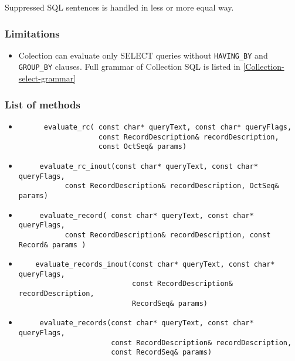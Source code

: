  Suppressed SQL sentences is handled in less or more equal way.
 
\subsubsection{ Limitations }

  \begin{itemize}
    \item Colection can evaluate only SELECT queries without \verb|HAVING_BY| and \verb|GROUP_BY| clauses. Full grammar of Collection SQL is listed in 
  \ref{Collection-select-grammar}
  \end{itemize}

\subsubsection{ List of methods }

\begin{itemize}
 \item 
   \begin{verbatim}
      evaluate_rc( const char* queryText, const char* queryFlags, 
                   const RecordDescription& recordDescription, 
                   const OctSeq& params)
   \end{verbatim}
 \item 
   \begin{verbatim}
     evaluate_rc_inout(const char* queryText, const char* queryFlags, 
           const RecordDescription& recordDescription, OctSeq& params)
   \end{verbatim}
 \item 
   \begin{verbatim}
     evaluate_record( const char* queryText, const char* queryFlags, 
           const RecordDescription& recordDescription, const Record& params )
   \end{verbatim}
 \item 
   \begin{verbatim}
    evaluate_records_inout(const char* queryText, const char* queryFlags, 
                           const RecordDescription& recordDescription, 
                           RecordSeq& params)
   \end{verbatim}
 \item 
   \begin{verbatim}
     evaluate_records(const char* queryText, const char* queryFlags, 
                      const RecordDescription& recordDescription, 
                      const RecordSeq& params)
   \end{verbatim}
\end{itemize}

